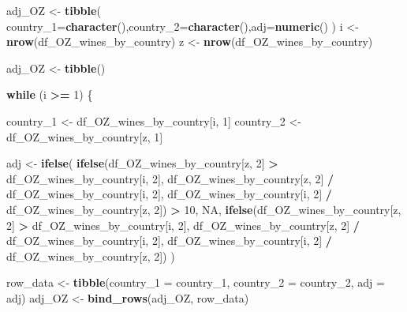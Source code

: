 \documentclass[
]{article}
\newenvironment{Shaded}{\begin{snugshade}}{\end{snugshade}}
\newcommand{\AttributeTok}[1]{\textcolor[rgb]{0.13,0.29,0.53}{#1}}
\newcommand{\ConstantTok}[1]{\textcolor[rgb]{0.56,0.35,0.01}{#1}}
\newcommand{\ControlFlowTok}[1]{\textcolor[rgb]{0.13,0.29,0.53}{\textbf{#1}}}
\newcommand{\DecValTok}[1]{\textcolor[rgb]{0.00,0.00,0.81}{#1}}
\newcommand{\FunctionTok}[1]{\textcolor[rgb]{0.13,0.29,0.53}{\textbf{#1}}}
\newcommand{\NormalTok}[1]{#1}
\newcommand{\OtherTok}[1]{\textcolor[rgb]{0.56,0.35,0.01}{#1}}
\newcommand{\SpecialCharTok}[1]{\textcolor[rgb]{0.81,0.36,0.00}{\textbf{#1}}}
\begin{document}
\begin{Shaded}
\begin{Highlighting}[]
\NormalTok{adj\_OZ }\OtherTok{\textless{}{-}} \FunctionTok{tibble}\NormalTok{( }\AttributeTok{country\_1=}\FunctionTok{character}\NormalTok{(),}\AttributeTok{country\_2=}\FunctionTok{character}\NormalTok{(),}\AttributeTok{adj=}\FunctionTok{numeric}\NormalTok{()}
\NormalTok{)}
\NormalTok{i }\OtherTok{\textless{}{-}} \FunctionTok{nrow}\NormalTok{(df\_OZ\_wines\_by\_country)}
\NormalTok{z }\OtherTok{\textless{}{-}} \FunctionTok{nrow}\NormalTok{(df\_OZ\_wines\_by\_country)}

\NormalTok{adj\_OZ }\OtherTok{\textless{}{-}} \FunctionTok{tibble}\NormalTok{()  }

\ControlFlowTok{while}\NormalTok{ (i }\SpecialCharTok{\textgreater{}=} \DecValTok{1}\NormalTok{) \{  }

\NormalTok{  country\_1 }\OtherTok{\textless{}{-}}\NormalTok{ df\_OZ\_wines\_by\_country[i, }\DecValTok{1}\NormalTok{]}
\NormalTok{  country\_2 }\OtherTok{\textless{}{-}}\NormalTok{ df\_OZ\_wines\_by\_country[z, }\DecValTok{1}\NormalTok{]}

\NormalTok{  adj }\OtherTok{\textless{}{-}} \FunctionTok{ifelse}\NormalTok{(}
    \FunctionTok{ifelse}\NormalTok{(df\_OZ\_wines\_by\_country[z, }\DecValTok{2}\NormalTok{] }\SpecialCharTok{\textgreater{}}\NormalTok{ df\_OZ\_wines\_by\_country[i, }\DecValTok{2}\NormalTok{],}
\NormalTok{           df\_OZ\_wines\_by\_country[z, }\DecValTok{2}\NormalTok{] }\SpecialCharTok{/}\NormalTok{ df\_OZ\_wines\_by\_country[i, }\DecValTok{2}\NormalTok{],}
\NormalTok{           df\_OZ\_wines\_by\_country[i, }\DecValTok{2}\NormalTok{] }\SpecialCharTok{/}\NormalTok{ df\_OZ\_wines\_by\_country[z, }\DecValTok{2}\NormalTok{]) }\SpecialCharTok{\textgreater{}} \DecValTok{10}\NormalTok{,}
    \ConstantTok{NA}\NormalTok{,}
    \FunctionTok{ifelse}\NormalTok{(df\_OZ\_wines\_by\_country[z, }\DecValTok{2}\NormalTok{] }\SpecialCharTok{\textgreater{}}\NormalTok{ df\_OZ\_wines\_by\_country[i, }\DecValTok{2}\NormalTok{],}
\NormalTok{           df\_OZ\_wines\_by\_country[z, }\DecValTok{2}\NormalTok{] }\SpecialCharTok{/}\NormalTok{ df\_OZ\_wines\_by\_country[i, }\DecValTok{2}\NormalTok{],}
\NormalTok{           df\_OZ\_wines\_by\_country[i, }\DecValTok{2}\NormalTok{] }\SpecialCharTok{/}\NormalTok{ df\_OZ\_wines\_by\_country[z, }\DecValTok{2}\NormalTok{])}
\NormalTok{  )}

  
\NormalTok{  row\_data }\OtherTok{\textless{}{-}} \FunctionTok{tibble}\NormalTok{(}\AttributeTok{country\_1 =}\NormalTok{ country\_1, }\AttributeTok{country\_2 =}\NormalTok{ country\_2, }\AttributeTok{adj =}\NormalTok{ adj)}
\NormalTok{  adj\_OZ }\OtherTok{\textless{}{-}} \FunctionTok{bind\_rows}\NormalTok{(adj\_OZ, row\_data)}


\end{Highlighting}
\end{Shaded}
\end{document}
